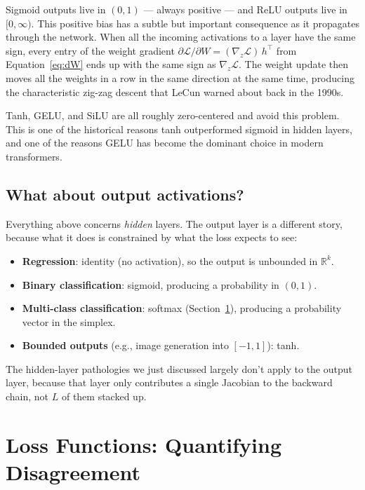 \documentclass[11pt, a4paper]{article}
\let\oldsection\section
\renewcommand{\section}{\clearpage\oldsection}
\newcommand{\R}{\mathbb{R}}
\newcommand{\T}{^{\!\top}}
\newcommand{\Loss}{\mathcal{L}}
\begin{document}
Sigmoid outputs live in $(0,1)$ --- always positive --- and ReLU outputs live in $[0, \infty)$. This positive bias has a subtle but important consequence as it propagates through the network. When all the incoming activations to a layer have the same sign, every entry of the weight gradient $\partial \Loss / \partial W = (\nabla_z \Loss)\, h\T$ from Equation~\eqref{eq:dW} ends up with the same sign as $\nabla_z \Loss$. The weight update then moves all the weights in a row in the same direction at the same time, producing the characteristic zig-zag descent that LeCun warned about back in the 1990s.

Tanh, GELU, and SiLU are all roughly zero-centered and avoid this problem. This is one of the historical reasons tanh outperformed sigmoid in hidden layers, and one of the reasons GELU has become the dominant choice in modern transformers.

\subsection{What about output activations?}

Everything above concerns \emph{hidden} layers. The output layer is a different story, because what it does is constrained by what the loss expects to see:
\begin{itemize}[leftmargin=*]
    \item \textbf{Regression}: identity (no activation), so the output is unbounded in $\R^k$.
    \item \textbf{Binary classification}: sigmoid, producing a probability in $(0,1)$.
    \item \textbf{Multi-class classification}: softmax (Section~\ref{sec:loss}), producing a probability vector in the simplex.
    \item \textbf{Bounded outputs} (e.g., image generation into $[-1, 1]$): tanh.
\end{itemize}
The hidden-layer pathologies we just discussed largely don't apply to the output layer, because that layer only contributes a single Jacobian to the backward chain, not $L$ of them stacked up.

\section{Loss Functions: Quantifying Disagreement}
\label{sec:loss}
\end{document}
